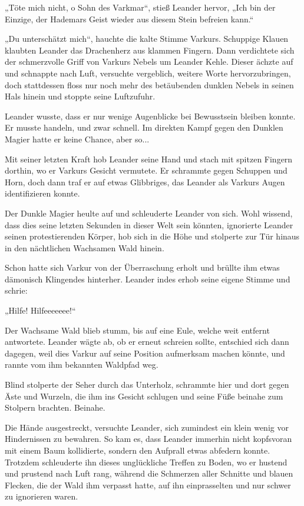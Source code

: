„Töte mich nicht, o Sohn des Varkmar“, stieß Leander hervor, „Ich bin der Einzige, der Hademars Geist wieder aus diesem Stein befreien kann.“

„Du unterschätzt mich“, hauchte die kalte Stimme Varkurs. Schuppige Klauen klaubten Leander das Drachenherz aus klammen Fingern. Dann verdichtete sich der schmerzvolle Griff von Varkurs Nebels um Leander Kehle. Dieser ächzte auf und schnappte nach Luft, versuchte vergeblich, weitere Worte hervorzubringen, doch stattdessen floss nur noch mehr des betäubenden dunklen Nebels in seinen Hals hinein und stoppte seine Luftzufuhr.

Leander wusste, dass er nur wenige Augenblicke bei Bewusstsein bleiben konnte. Er musste handeln, und zwar schnell. Im direkten Kampf gegen den Dunklen Magier hatte er keine Chance, aber so...

Mit seiner letzten Kraft hob Leander seine Hand und stach mit spitzen Fingern dorthin, wo er Varkurs Gesicht vermutete. Er schrammte gegen Schuppen und Horn, doch dann traf er auf etwas Glibbriges, das Leander als Varkurs Augen identifizieren konnte.

Der Dunkle Magier heulte auf und schleuderte Leander von sich. Wohl wissend, dass dies seine letzten Sekunden in dieser Welt sein könnten, ignorierte Leander seinen protestierenden Körper, hob sich in die Höhe und stolperte zur Tür hinaus in den nächtlichen Wachsamen Wald hinein.

Schon hatte sich Varkur von der Überraschung erholt und brüllte ihm etwas dämonisch Klingendes hinterher. Leander indes erhob seine eigene Stimme und schrie:

„Hilfe! Hilfeeeeeee!“

Der Wachsame Wald blieb stumm, bis auf eine Eule, welche weit entfernt antwortete. Leander wägte ab, ob er erneut schreien sollte, entschied sich dann dagegen, weil dies Varkur auf seine Position aufmerksam machen könnte, und rannte vom ihm bekannten Waldpfad weg.

Blind stolperte der Seher durch das Unterholz, schrammte hier und dort gegen Äste und Wurzeln, die ihm ins Gesicht schlugen und seine Füße beinahe zum Stolpern brachten. Beinahe.

Die Hände ausgestreckt, versuchte Leander, sich zumindest ein klein wenig vor Hindernissen zu bewahren. So kam es, dass Leander immerhin nicht kopfsvoran mit einem Baum kollidierte, sondern den Aufprall etwas abfedern konnte. Trotzdem schleuderte ihn dieses unglückliche Treffen zu Boden, wo er hustend und prustend nach Luft rang, während die Schmerzen aller Schnitte und blauen Flecken, die der Wald ihm verpasst hatte, auf ihn einprasselten und nur schwer zu ignorieren waren.

